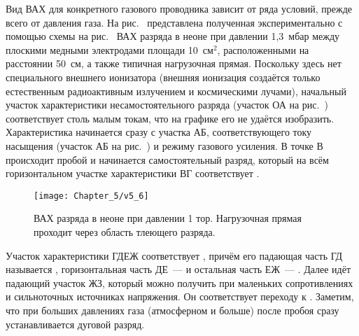 Вид ВАХ для конкретного газового проводника зависит от ряда условий, прежде
всего от давления газа. На рис.~
представлена полученная экспериментально с помощью схемы на рис.~ ВАХ разряда в неоне при давлении 1,3~мбар между плоскими
медными электродами площади 10~см$^2$, расположенными на расстоянии 50~см, а
также типичная нагрузочная прямая. Поскольку
здесь нет специального внешнего ионизатора (внешняя ионизация создаётся только
естественным радиоактивным излучением и
космическими лучами), начальный участок характеристики несамостоятельного
разряда (участок ОА на рис.~) соответствует
столь малым токам, что на графике его не удаётся изобразить. Характеристика
начинается сразу с участка АБ,
соответствующего току насыщения (участок АБ на рис.~) и режиму газового усиления. В точке В происходит пробой и
начинается самостоятельный разряд, который на всём горизонтальном участке
характеристики ВГ соответствует .

\begin{figure}[h!]
	\centering
	\texttt{[image: Chapter\_5/v5\_6]}
	\caption{ВАХ разряда в неоне при давлении 1 тор. Нагрузочная прямая проходит
через область тлеющего разряда.}
\end{figure}

Участок характеристики ГДЕЖ соответствует , причём
его падающая часть ГД называется
, горизонтальная часть ДЕ~---
 и остальная часть
ЕЖ~--- . Далее идёт падающий участок ЖЗ,
который можно получить при маленьких
сопротивлениях и сильноточных источниках напряжения. Он соответствует переходу к
. Заметим, что
при больших давлениях газа (атмосферном и больше) после пробоя сразу
устанавливается дуговой разряд.

